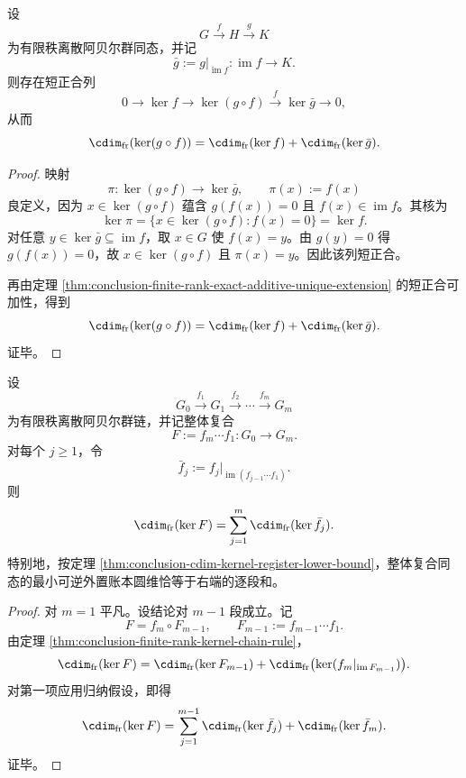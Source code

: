 \begin{theorem}\label{thm:conclusion-finite-rank-kernel-chain-rule}
设
\[
G\xrightarrow{f}H\xrightarrow{g}K
\]
为有限秩离散阿贝尔群同态，并记
\[
\bar g:=g|_{\operatorname{im}f}:\operatorname{im}f\to K.
\]
则存在短正合列
\[
0\to \ker f\to \ker(g\circ f)\xrightarrow{\,f\,}\ker \bar g\to 0,
\]
从而
\[
\cdim_{\mathrm{fr}}(\ker(g\circ f))
=
\cdim_{\mathrm{fr}}(\ker f)+\cdim_{\mathrm{fr}}(\ker \bar g).
\]
\end{theorem}
\begin{proof}
映射
\[
\pi:\ker(g\circ f)\to \ker\bar g,
\qquad
\pi(x):=f(x)
\]
良定义，因为 \(x\in\ker(g\circ f)\) 蕴含 \(g(f(x))=0\) 且 \(f(x)\in\operatorname{im}f\)。其核为
\[
\ker\pi=\{x\in\ker(g\circ f):f(x)=0\}=\ker f.
\]
对任意 \(y\in\ker\bar g\subseteq \operatorname{im}f\)，取 \(x\in G\) 使 \(f(x)=y\)。由 \(g(y)=0\) 得 \(g(f(x))=0\)，故 \(x\in\ker(g\circ f)\) 且 \(\pi(x)=y\)。因此该列短正合。

再由定理 \ref{thm:conclusion-finite-rank-exact-additive-unique-extension} 的短正合可加性，得到
\[
\cdim_{\mathrm{fr}}(\ker(g\circ f))
=
\cdim_{\mathrm{fr}}(\ker f)+\cdim_{\mathrm{fr}}(\ker \bar g).
\]
证毕。
\end{proof}

\begin{corollary}[多段相位压缩的账本望远镜律]\label{cor:conclusion-finite-rank-ledger-telescoping-law}
设
\[
G_0\xrightarrow{f_1}G_1\xrightarrow{f_2}\cdots\xrightarrow{f_m}G_m
\]
为有限秩离散阿贝尔群链，并记整体复合
\[
F:=f_m\cdots f_1:G_0\to G_m.
\]
对每个 \(j\ge 1\)，令
\[
\bar f_j:=f_j|_{\operatorname{im}(f_{j-1}\cdots f_1)}.
\]
则
\[
\cdim_{\mathrm{fr}}(\ker F)
=
\sum_{j=1}^{m}\cdim_{\mathrm{fr}}(\ker \bar f_j).
\]
特别地，按定理 \ref{thm:conclusion-cdim-kernel-register-lower-bound}，整体复合同态的最小可逆外置账本圆维恰等于右端的逐段和。
\end{corollary}
\begin{proof}
对 \(m=1\) 平凡。设结论对 \(m-1\) 段成立。记
\[
F=f_m\circ F_{m-1},
\qquad
F_{m-1}:=f_{m-1}\cdots f_1.
\]
由定理 \ref{thm:conclusion-finite-rank-kernel-chain-rule}，
\[
\cdim_{\mathrm{fr}}(\ker F)
=
\cdim_{\mathrm{fr}}(\ker F_{m-1})
+\cdim_{\mathrm{fr}}\bigl(\ker(f_m|_{\operatorname{im}F_{m-1}})\bigr).
\]
对第一项应用归纳假设，即得
\[
\cdim_{\mathrm{fr}}(\ker F)
=
\sum_{j=1}^{m-1}\cdim_{\mathrm{fr}}(\ker \bar f_j)
+\cdim_{\mathrm{fr}}(\ker \bar f_m).
\]
证毕。
\end{proof}

